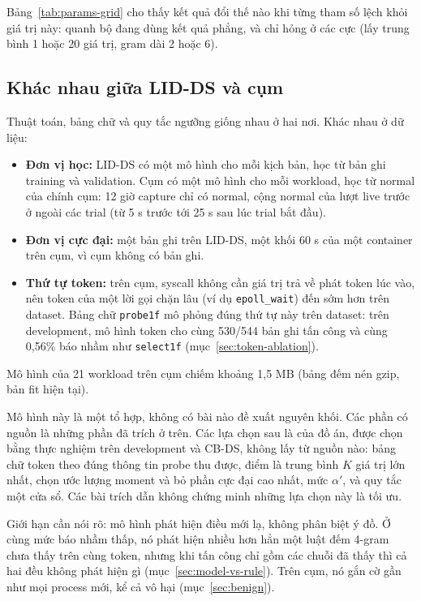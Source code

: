 Bảng~\ref{tab:params-grid} cho thấy kết quả đổi thế nào khi từng tham số lệch khỏi giá trị này: quanh bộ đang dùng kết quả phẳng, và chỉ hỏng ở các cực (lấy trung bình 1 hoặc 20 giá trị, gram dài 2 hoặc 6).

\subsection{Khác nhau giữa LID-DS và cụm}

Thuật toán, bảng chữ và quy tắc ngưỡng giống nhau ở hai nơi. Khác nhau ở dữ liệu:

\begin{itemize}
\tightlist
\item
  \textbf{Đơn vị học:} LID-DS có một mô hình cho mỗi kịch bản, học từ bản ghi training và validation. Cụm có một mô hình cho mỗi workload, học từ normal của chính cụm: 12 giờ capture chỉ có normal, cộng normal của lượt live trước ở ngoài các trial (từ 5 s trước tới 25 s sau lúc trial bắt đầu).
\item
  \textbf{Đơn vị cực đại:} một bản ghi trên LID-DS, một khối 60 s của một container trên cụm, vì cụm không có bản ghi.
\item
  \textbf{Thứ tự token:} trên cụm, syscall không cần giá trị trả về phát token lúc vào, nên token của một lời gọi chặn lâu (ví dụ \texttt{epoll\_wait}) đến sớm hơn trên dataset. Bảng chữ \texttt{probe1f} mô phỏng đúng thứ tự này trên dataset: trên development, mô hình token cho cùng 530/544 bản ghi tấn công và cùng 0,56\% báo nhầm như \texttt{select1f} (mục~\ref{sec:token-ablation}).
\end{itemize}

Mô hình của 21 workload trên cụm chiếm khoảng 1,5 MB (bảng đếm nén gzip, bản fit hiện tại).

Mô hình này là một tổ hợp, không có bài nào đề xuất nguyên khối. Các phần có nguồn là những phần đã trích ở trên. Các lựa chọn sau là của đồ án, được chọn bằng thực nghiệm trên development và CB-DS, không lấy từ nguồn nào: bảng chữ token theo đúng thông tin probe thu được, điểm là trung bình $K$ giá trị lớn nhất, chọn ước lượng moment và bỏ phần cực đại cao nhất, mức $\alpha'$, và quy tắc một cửa sổ. Các bài trích dẫn không chứng minh những lựa chọn này là tối ưu.

Giới hạn cần nói rõ: mô hình phát hiện điều mới lạ, không phân biệt ý đồ. Ở cùng mức báo nhầm thấp, nó phát hiện nhiều hơn hẳn một luật đếm 4-gram chưa thấy trên cùng token, nhưng khi tấn công chỉ gồm các chuỗi đã thấy thì cả hai đều không phát hiện gì (mục~\ref{sec:model-vs-rule}). Trên cụm, nó gắn cờ gần như mọi process mới, kể cả vô hại (mục~\ref{sec:benign}).

